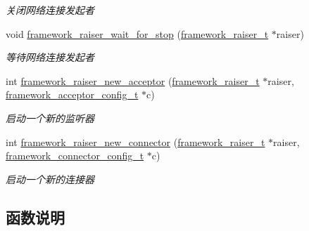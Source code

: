 \begin{DoxyCompactItemize}
\begin{DoxyCompactList}\small\item\em 关闭网络连接发起者 \end{DoxyCompactList}\item 
void \hyperlink{a00059_a6f3a981ad344559bca4f51c73a0c678b_a6f3a981ad344559bca4f51c73a0c678b}{framework\+\_\+raiser\+\_\+wait\+\_\+for\+\_\+stop} (\hyperlink{a00051_aa3ac31db191829c9e6db624d660a2563_aa3ac31db191829c9e6db624d660a2563}{framework\+\_\+raiser\+\_\+t} $\ast$raiser)
\begin{DoxyCompactList}\small\item\em 等待网络连接发起者 \end{DoxyCompactList}\item 
int \hyperlink{a00059_ad199c6f451f0e2362371dcf6445efca6_ad199c6f451f0e2362371dcf6445efca6}{framework\+\_\+raiser\+\_\+new\+\_\+acceptor} (\hyperlink{a00051_aa3ac31db191829c9e6db624d660a2563_aa3ac31db191829c9e6db624d660a2563}{framework\+\_\+raiser\+\_\+t} $\ast$raiser, \hyperlink{a00051_a61a4e424ff4c86631423dedd97c40064_a61a4e424ff4c86631423dedd97c40064}{framework\+\_\+acceptor\+\_\+config\+\_\+t} $\ast$c)
\begin{DoxyCompactList}\small\item\em 启动一个新的监听器 \end{DoxyCompactList}\item 
int \hyperlink{a00059_ac82f5d62a951a7f7fccfa23390672c9c_ac82f5d62a951a7f7fccfa23390672c9c}{framework\+\_\+raiser\+\_\+new\+\_\+connector} (\hyperlink{a00051_aa3ac31db191829c9e6db624d660a2563_aa3ac31db191829c9e6db624d660a2563}{framework\+\_\+raiser\+\_\+t} $\ast$raiser, \hyperlink{a00051_a81253f4c995b97e69be0e67f7a26097f_a81253f4c995b97e69be0e67f7a26097f}{framework\+\_\+connector\+\_\+config\+\_\+t} $\ast$c)
\begin{DoxyCompactList}\small\item\em 启动一个新的连接器 \end{DoxyCompactList}\end{DoxyCompactItemize}


\subsection{函数说明}
\hypertarget{a00059_a6a305a33afdea0d9b774d4b987aff05e_a6a305a33afdea0d9b774d4b987aff05e}{}
